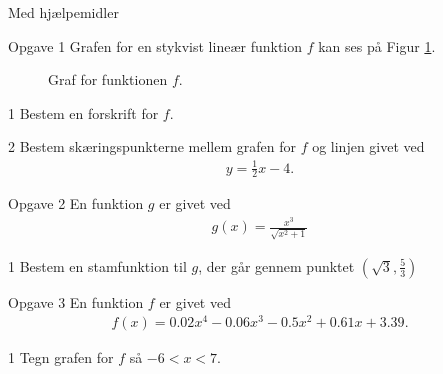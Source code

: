\begin{center}
	\LARGE
	Med hjælpemidler
\end{center}

\begin{opgavetekst}{Opgave 1}
	Grafen for en stykvist lineær funktion $f$ kan ses på Figur \ref{fig:styk}.
	\begin{figure}[H]
		\centering
		\caption{Graf for funktionen $f$.}
		\label{fig:styk}
	\end{figure}
	\phantom{h}
\end{opgavetekst}
\begin{delopgave}{1}
	Bestem en forskrift for $f$.
\end{delopgave}
\begin{delopgave}{2}
	Bestem skæringspunkterne mellem grafen for $f$ og linjen givet ved
	\begin{align*}
		y = \frac{1}{2}x-4.
	\end{align*}
\end{delopgave}
%
%
%
%
%
\begin{opgavetekst}{Opgave 2}
	En funktion $g$ er givet ved
	\begin{align*}
		g(x) = \frac{x^3}{\sqrt{x^2 + 1}}
	\end{align*}
\end{opgavetekst}
\begin{delopgave}{1}
	Bestem en stamfunktion til $g$, der går gennem punktet $(\sqrt{3},\frac{5}{3})$
\end{delopgave}
%
%
%
%
%
\newpage
\begin{opgavetekst}{Opgave 3}
	En funktion $f$ er givet ved
	\begin{align*}
		f(x) = 0.02x^4 - 0.06x^3 - 0.5x^2 + 0.61x + 3.39.
	\end{align*}
\end{opgavetekst}
\begin{delopgave}{1}
	Tegn grafen for $f$ så $-6 < x < 7$.
\end{delopgave}

